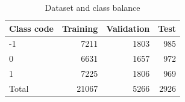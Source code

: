 \begin{table}[htbp]
\centering
\caption{Dataset and class balance}
\label{tab:dataset}
\small
\begin{tabular}{lrrr}
\toprule
Class code & Training & Validation & Test \\
\midrule
-1 & 7211 & 1803 & 985 \\
0 & 6631 & 1657 & 972 \\
1 & 7225 & 1806 & 969 \\
Total & 21067 & 5266 & 2926 \\
\bottomrule
\end{tabular}
\end{table}
